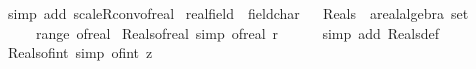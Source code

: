\begin{isabellebody}
%
\isadelimproof
%
\endisadelimproof
%
\isatagproof
{}\isamarkupfalse%
\ {\isacharparenleft}{\kern0pt}simp\ add{\isacharcolon}{\kern0pt}\ scaleR{\isacharunderscore}{\kern0pt}conv{\isacharunderscore}{\kern0pt}of{\isacharunderscore}{\kern0pt}real{\isacharparenright}{\kern0pt}%
\endisatagproof
{\isafoldproof}%
%
\isadelimproof
\isanewline
%
\endisadelimproof
\isanewline
{}\isamarkupfalse%
\ real{\isacharunderscore}{\kern0pt}field\ {\isacharless}{\kern0pt}\ field{\isacharunderscore}{\kern0pt}char{\isacharunderscore}{\kern0pt}{}%
\isadelimproof
\ %
\endisadelimproof
%
\isatagproof
\isacommand{{\isachardot}{\kern0pt}{\isachardot}{\kern0pt}}\isamarkupfalse%
%
\endisatagproof
{\isafoldproof}%
%
\isadelimproof
%
\endisadelimproof
%
\isadelimdocument
%
\endisadelimdocument
%
\isatagdocument
%
\isamarkuptrue%
%
\endisatagdocument
{\isafolddocument}%
%
\isadelimdocument
%
\endisadelimdocument
{}\isamarkupfalse%
\ Reals\ {\isacharcolon}{\kern0pt}{\isacharcolon}{\kern0pt}\ {\isachardoublequoteopen}{\isacharprime}{\kern0pt}a{\isacharcolon}{\kern0pt}{\isacharcolon}{\kern0pt}real{\isacharunderscore}{\kern0pt}algebra{\isacharunderscore}{\kern0pt}{}\ set{\isachardoublequoteclose}\ \ {\isacharparenleft}{\kern0pt}{\isachardoublequoteopen}{\isasymreal}{\isachardoublequoteclose}{\isacharparenright}{\kern0pt}\isanewline
\ \ \ {\isachardoublequoteopen}{\isasymreal}\ {\isacharequal}{\kern0pt}\ range\ of{\isacharunderscore}{\kern0pt}real{\isachardoublequoteclose}\isanewline
\isanewline
{}\isamarkupfalse%
\ Reals{\isacharunderscore}{\kern0pt}of{\isacharunderscore}{\kern0pt}real\ {\isacharbrackleft}{\kern0pt}simp{\isacharbrackright}{\kern0pt}{\isacharcolon}{\kern0pt}\ {\isachardoublequoteopen}of{\isacharunderscore}{\kern0pt}real\ r\ {\isasymin}\ {\isasymreal}{\isachardoublequoteclose}\isanewline
%
\isadelimproof
\ \ %
\endisadelimproof
%
\isatagproof
{}\isamarkupfalse%
\ {\isacharparenleft}{\kern0pt}simp\ add{\isacharcolon}{\kern0pt}\ Reals{\isacharunderscore}{\kern0pt}def{\isacharparenright}{\kern0pt}%
\endisatagproof
{\isafoldproof}%
%
\isadelimproof
\isanewline
%
\endisadelimproof
\isanewline
{}\isamarkupfalse%
\ Reals{\isacharunderscore}{\kern0pt}of{\isacharunderscore}{\kern0pt}int\ {\isacharbrackleft}{\kern0pt}simp{\isacharbrackright}{\kern0pt}{\isacharcolon}{\kern0pt}\ {\isachardoublequoteopen}of{\isacharunderscore}{\kern0pt}int\ z\ {\isasymin}\ {\isasymreal}{\isachardoublequoteclose}\isanewline

\end{isabellebody}
